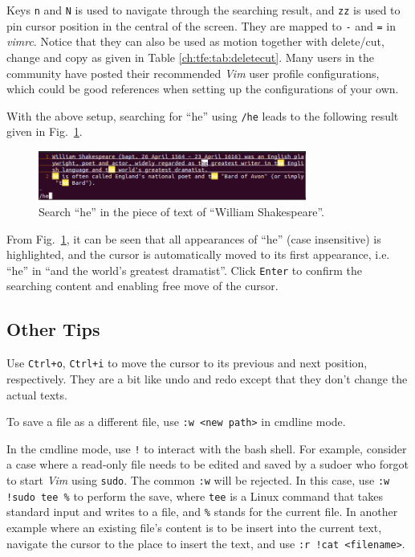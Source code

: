 Keys \verb|n| and \verb|N| is used to navigate through the searching result, and \verb|zz| is used to pin cursor position in the central of the screen. They are mapped to \verb|-| and \verb|=| in \textit{vimrc}. Notice that they can also be used as motion together with delete/cut, change and copy as given in Table \ref{ch:tfe:tab:deletecut}. Many users in the community have posted their recommended \textit{Vim} user profile configurations, which could be good references when setting up the configurations of your own.

With the above setup, searching for ``he'' using \verb|/he| leads to the following result given in Fig.~\ref{ch:tfe:fig:vimdemo2}.
\begin{figure}
\centering
\includegraphics[width=250pt]{chapters/ch-text-file-editing/figures/vimdemo2.png}
\caption{Search ``he'' in the piece of text of ``William Shakespeare''.} \label{ch:tfe:fig:vimdemo2}
\end{figure}
From Fig.~\ref{ch:tfe:fig:vimdemo2}, it can be seen that all appearances of ``he'' (case insensitive) is highlighted, and the cursor is automatically moved to its first appearance, i.e. ``he'' in ``and the world's greatest dramatist''. Click \verb|Enter| to confirm the searching content and enabling free move of the cursor.

\subsection{Other Tips}

Use \verb|Ctrl+o|, \verb|Ctrl+i| to move the cursor to its previous and next position, respectively. They are a bit like undo and redo except that they don't change the actual texts.

To save a file as a different file, use \verb|:w <new path>| in cmdline mode.

In the cmdline mode, use \verb|!| to interact with the bash shell. For example, consider a case where a read-only file needs to be edited and saved by a sudoer who forgot to start \textit{Vim} using \verb|sudo|. The common \verb|:w| will be rejected. In this case, use \verb|:w !sudo tee %| to perform the save, where \verb|tee| is a Linux command that takes standard input and writes to a file, and \verb|%| stands for the current file. In another example where an existing file's content is to be insert into the current text, navigate the cursor to the place to insert the text, and use \verb|:r !cat <filename>|.

